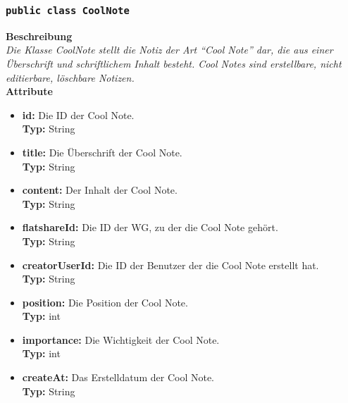 \subsubsection{\texttt{public class CoolNote}}

	\textbf{Beschreibung} \\
	\textit{Die Klasse CoolNote stellt die Notiz der Art “Cool Note” dar, die aus einer Überschrift und schriftlichem Inhalt besteht. Cool Notes sind erstellbare, nicht editierbare, löschbare Notizen.} \\
	
	\textbf{Attribute}
	\begin{itemize}
		\item \textbf{id:} Die ID der Cool Note. \\
		\textbf{Typ:} String
		\item \textbf{title:} Die Überschrift der Cool Note. \\
		\textbf{Typ:} String
		\item \textbf{content:} Der Inhalt der Cool Note. \\
		\textbf{Typ:} String
		\item \textbf{flatshareId:} Die ID der WG, zu der die Cool Note gehört. \\
		\textbf{Typ:} String
		\item \textbf{creatorUserId:} Die ID der Benutzer der die Cool Note erstellt hat. \\
		\textbf{Typ:} String
		\item \textbf{position:} Die Position der Cool Note. \\
		\textbf{Typ:} int
		\item \textbf{importance:} Die Wichtigkeit der Cool Note. \\
		\textbf{Typ:} int
		\item \textbf{createAt:} Das Erstelldatum der Cool Note.\\
		\textbf{Typ:} String
	\end{itemize}

